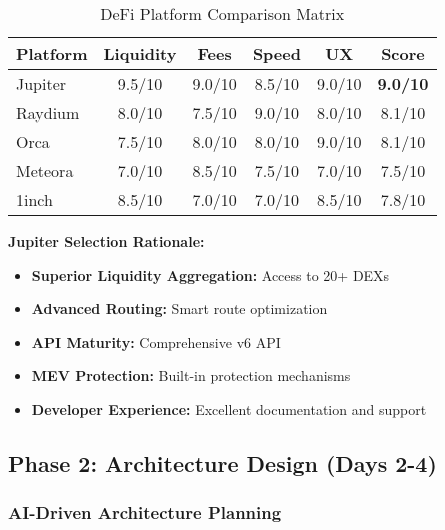 \documentclass[11pt,a4paper]{article}
\begin{document}
\begin{table}[h]
\centering
\begin{tabular}{|l|c|c|c|c|c|}
\hline
\textbf{Platform} & \textbf{Liquidity} & \textbf{Fees} & \textbf{Speed} & \textbf{UX} & \textbf{Score} \\
\hline
Jupiter & 9.5/10 & 9.0/10 & 8.5/10 & 9.0/10 & \textbf{9.0/10} \\
Raydium & 8.0/10 & 7.5/10 & 9.0/10 & 8.0/10 & 8.1/10 \\
Orca & 7.5/10 & 8.0/10 & 8.0/10 & 9.0/10 & 8.1/10 \\
Meteora & 7.0/10 & 8.5/10 & 7.5/10 & 7.0/10 & 7.5/10 \\
1inch & 8.5/10 & 7.0/10 & 7.0/10 & 8.5/10 & 7.8/10 \\
\hline
\end{tabular}
\caption{DeFi Platform Comparison Matrix}
\end{table}

\textbf{Jupiter Selection Rationale:}
\begin{itemize}
    \item \textbf{Superior Liquidity Aggregation:} Access to 20+ DEXs
    \item \textbf{Advanced Routing:} Smart route optimization
    \item \textbf{API Maturity:} Comprehensive v6 API
    \item \textbf{MEV Protection:} Built-in protection mechanisms
    \item \textbf{Developer Experience:} Excellent documentation and support
\end{itemize}

\subsection{Phase 2: Architecture Design (Days 2-4)}

\subsubsection{AI-Driven Architecture Planning}
\end{document}
